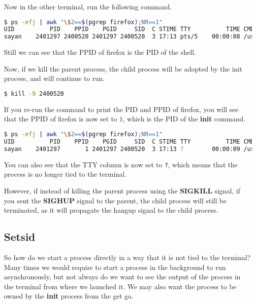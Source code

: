 Now in the other terminal, run the following command.

\begin{lstlisting}[language=bash]
$ ps -efj | awk "\$2==$(pgrep firefox);NR==1"
UID          PID    PPID    PGID     SID  C STIME TTY          TIME CMD
sayan    2401297 2400520 2401297 2400520  3 17:13 pts/5    00:00:08 /usr/lib/firefox/firefox
\end{lstlisting}

Still we can see that the PPID of firefox is the PID of the shell.

Now, if we kill the parent process, the child process will be adopted by the
init process, and will continue to run.

\begin{lstlisting}[language=bash]
$ kill -9 2400520
\end{lstlisting}

If you re-run the command to print the PID and PPID of firefox, you will see
that the PPID of firefox is now set to $1$, which is the PID of the \textbf{init}
command.

\begin{lstlisting}[language=bash]
$ ps -efj | awk "\$2==$(pgrep firefox);NR==1"
UID          PID    PPID    PGID     SID  C STIME TTY          TIME CMD
sayan    2401297       1 2401297 2400520  3 17:13 ?        00:00:09 /usr/lib/firefox/firefox
\end{lstlisting}

You can also see that the TTY column is now set to \lstinline|?|, which means that
the process is no longer tied to the terminal.

However, if instead of killing the parent process using the \textbf{SIGKILL}
signal, if you sent the \textbf{SIGHUP} signal to the parent, the child process
will still be terminated, as it will propagate the hangup signal to the child process.


\subsection{Setsid}

So how do we start a process directly in a way that it is not tied to the terminal?
Many times we would require to start a process in the background to run
asynchronously, but not always do we want to see the output of the process
in the terminal from where we launched it. We may also want the process
to be owned by the \textbf{init} process from the get go.


